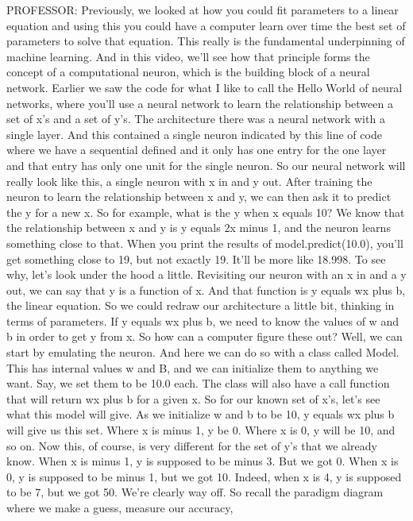 PROFESSOR: Previously, we looked at how you could fit parameters
to a linear equation and using this you could have a computer
learn over time the best set of parameters to solve that equation.
This really is the fundamental underpinning of machine learning.
And in this video, we'll see how that principle forms
the concept of a computational neuron, which is
the building block of a neural network.
Earlier we saw the code for what I like to call the Hello World of neural
networks, where you'll use a neural network to learn the relationship
between a set of x's and a set of y's.
The architecture there was a neural network with a single layer.
And this contained a single neuron indicated by this line of code
where we have a sequential defined and it only has one entry for the one layer
and that entry has only one unit for the single neuron.
So our neural network will really look like this, a single neuron with x in
and y out.
After training the neuron to learn the relationship between x and y,
we can then ask it to predict the y for a new x.
So for example, what is the y when x equals 10?
We know that the relationship between x and y is y equals 2x minus 1,
and the neuron learns something close to that.
When you print the results of model.predict(10.0),
you'll get something close to 19, but not exactly 19.
It'll be more like 18.998.
To see why, let's look under the hood a little.
Revisiting our neuron with an x in and a y out,
we can say that y is a function of x.
And that function is y equals wx plus b, the linear equation.
So we could redraw our architecture a little bit,
thinking in terms of parameters.
If y equals wx plus b, we need to know the values of w and b
in order to get y from x.
So how can a computer figure these out?
Well, we can start by emulating the neuron.
And here we can do so with a class called Model.
This has internal values w and B, and we can initialize them
to anything we want.
Say, we set them to be 10.0 each.
The class will also have a call function that will return wx plus
b for a given x.
So for our known set of x's, let's see what this model will give.
As we initialize w and b to be 10, y equals wx plus b will give us this set.
Where x is minus 1, y be 0.
Where x is 0, y will be 10, and so on.
Now this, of course, is very different for the set of y's that we already
know.
When x is minus 1, y is supposed to be minus 3.
But we got 0.
When x is 0, y is supposed to be minus 1, but we got 10.
Indeed, when x is 4, y is supposed to be 7, but we got 50.
We're clearly way off.
So recall the paradigm diagram where we make a guess, measure our accuracy,
